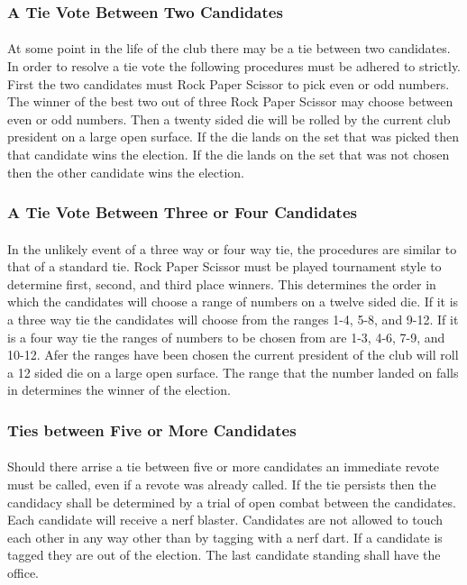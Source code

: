 \documentclass[12pt]{article}
\begin{document}
\subsubsection{A Tie Vote Between Two Candidates}
\paragraph{}
At some point in the life of the club there may be a tie between two candidates. In order to resolve a tie vote the following procedures must be adhered to strictly. First the two candidates must Rock Paper Scissor to pick even or odd numbers. The winner of the best two out of three Rock Paper Scissor may choose between even or odd numbers. Then a twenty sided die will be rolled by the current club president on a large open surface. If the die lands on the set that was picked then that candidate wins the election. If the die lands on the set that was not chosen then the other candidate wins the election.

\subsubsection {A Tie Vote Between Three or Four Candidates}
\paragraph{}
In the unlikely event of a three way or four way tie, the procedures are similar to that of a standard tie. Rock Paper Scissor must be played tournament style to determine first, second, and third place winners. This determines the order in which the candidates will choose a range of numbers on a twelve sided die. If it is a three way tie the candidates will choose from the ranges 1-4, 5-8, and 9-12. If it is a four way tie the ranges of numbers to be chosen from are 1-3, 4-6, 7-9, and 10-12. Afer the ranges have been chosen the current president of the club will roll a 12 sided die on a large open surface. The range that the number landed on falls in determines the winner of the election.

\subsubsection{Ties between Five or More Candidates}
\paragraph{}
Should there arrise a tie between five or more candidates an immediate revote must be called, even if a revote was already called. If the tie persists then the candidacy shall be determined by a trial of open combat between the candidates. Each candidate will receive a nerf blaster. Candidates are not allowed to touch each other in any way other than by tagging with a nerf dart. If a candidate is tagged they are out of the election. The last candidate standing shall have the office.
\end{document}
